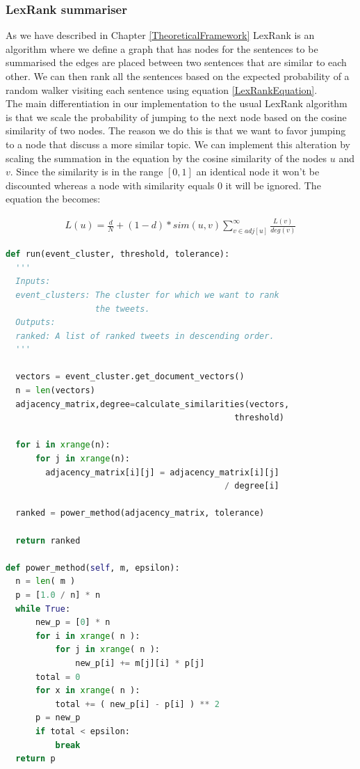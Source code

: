 \subsubsection{LexRank summariser}
As we have described in Chapter \ref{TheoreticalFramework} 
LexRank is an algorithm where we deﬁne a graph that has nodes for the sentences to be summarised the 
edges are placed between two sentences that are similar to each other. We can then rank all the sentences 
based on the expected probability of a random walker visiting each sentence using equation \ref{LexRankEquation}. \\
The main differentiation in our implementation to the usual LexRank algorithm is that we scale the probability of 
jumping to the next node based on the cosine similarity of two nodes. The reason we do this is that we want to favor jumping to 
a node that discuss a more similar topic. We can implement this alteration by scaling the summation in the equation by the cosine similarity 
of the nodes $u$ and $v$. Since the similarity is in the range $[0, 1]$ an identical node it won't be discounted whereas a node with similarity equals 0 
it will be ignored. The equation the becomes:

\begin{eqnarray}\label{LexRankEquationModified}
L(u) = \frac{d}{N} + (1-d) * sim(u, v) \sum_{v \in adj[u]}^{\infty}\frac{L(v)}{deg(v)}
\end{eqnarray} 

\begin{lstlisting}[language=Python, label=CentroidSummariserSnippet, caption=Pseudocode for the centoid-based summariser.]
def run(event_cluster, threshold, tolerance):
  '''
  Inputs:
  event_clusters: The cluster for which we want to rank 
                  the tweets.
  Outputs:
  ranked: A list of ranked tweets in descending order. 
  '''        

  vectors = event_cluster.get_document_vectors()      
  n = len(vectors)
  adjacency_matrix,degree=calculate_similarities(vectors, 
                                              threshold)
  
  for i in xrange(n):
      for j in xrange(n):
        adjacency_matrix[i][j] = adjacency_matrix[i][j] 
                                            / degree[i]
                                            
  ranked = power_method(adjacency_matrix, tolerance)        
  
  return ranked
    
def power_method(self, m, epsilon):
  n = len( m )
  p = [1.0 / n] * n
  while True:
      new_p = [0] * n
      for i in xrange( n ):
          for j in xrange( n ):
              new_p[i] += m[j][i] * p[j]
      total = 0
      for x in xrange( n ):
          total += ( new_p[i] - p[i] ) ** 2
      p = new_p
      if total < epsilon:
          break
  return p  
\end{lstlisting}


